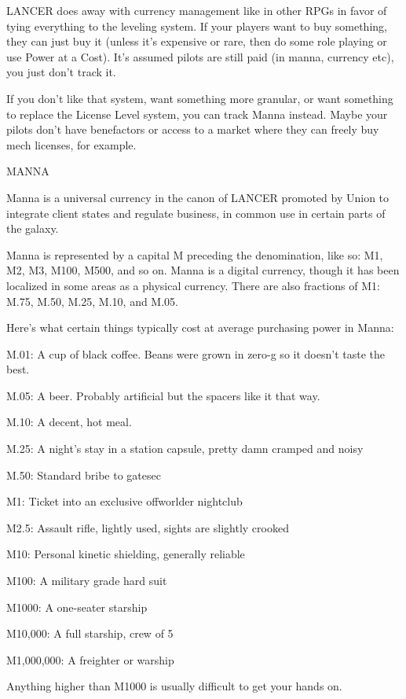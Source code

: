 LANCER does away with currency management like in other RPGs in favor of tying everything to
the leveling system. If your players want to buy something, they can just buy it (unless it’s
expensive or rare, then do some role playing or use Power at a Cost). It’s assumed pilots are
still paid (in manna, currency etc), you just don’t track it.

If you don’t like that system, want something more granular, or want something to replace the
License Level system, you can track Manna instead. Maybe your pilots don’t have benefactors or
access to a market where they can freely buy mech licenses, for example.


                                                     MANNA

Manna is a universal currency in the canon of LANCER promoted by Union to integrate client
states and regulate business, in common use in certain parts of the galaxy.


Manna is represented by a capital M preceding the denomination, like so: M1, M2, M3, M100,
M500, and so on. Manna is a digital currency, though it has been localized in some areas as a
physical currency. There are also fractions of M1: M.75, M.50, M.25, M.10, and M.05.


Here’s what certain things typically cost at average purchasing power in Manna:





M.01: A cup of black coffee. Beans were grown in zero-g so it doesn’t taste the best.

M.05: A beer. Probably artificial but the spacers like it that way.

M.10: A decent, hot meal.

M.25: A night’s stay in a station capsule, pretty damn cramped and noisy

M.50: Standard bribe to gatesec

M1: Ticket into an exclusive offworlder nightclub

M2.5: Assault rifle, lightly used, sights are slightly crooked

M10: Personal kinetic shielding, generally reliable

M100: A military grade hard suit

M1000: A one-seater starship

M10,000: A full starship, crew of 5

M1,000,000: A freighter or warship

Anything higher than M1000 is usually difficult to get your hands on.


